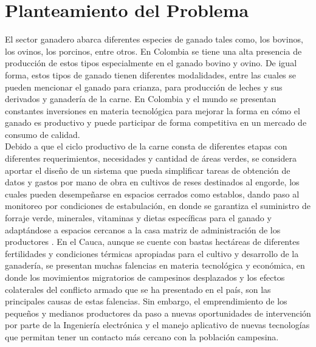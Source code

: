 
\section{Planteamiento del Problema} \label{plant}

El sector ganadero abarca diferentes especies de ganado tales como, los bovinos, los ovinos, los porcinos, entre otros. En Colombia se tiene una alta presencia de producción de estos tipos especialmente en el ganado bovino y ovino. De igual forma, estos tipos de ganado tienen diferentes modalidades, entre las cuales se pueden mencionar el ganado para crianza, para producción de leches y sus derivados y ganadería de la carne. En Colombia y el mundo se presentan constantes inversiones en materia tecnológica para mejorar la forma en cómo el ganado es productivo y puede participar de forma competitiva en un mercado de consumo de calidad.\\

Debido a que el ciclo productivo de la carne consta de diferentes etapas con diferentes requerimientos, necesidades y cantidad de áreas verdes, se considera aportar el diseño de un sistema que pueda simplificar  tareas de obtención de datos y gastos por mano de obra en cultivos de reses destinados al engorde, los cuales pueden desempeñarse en espacios cerrados como establos, dando paso al monitoreo por condiciones de estabulación, en donde se garantiza el suministro de forraje verde, minerales, vitaminas y dietas específicas para el ganado y adaptándose a espacios cercanos a la casa matriz de administración de los productores \cite{contextoganadero}.
En el Cauca, aunque se cuente con bastas hectáreas de diferentes fertilidades y condiciones térmicas apropiadas para el cultivo y desarrollo de la ganadería, se presentan muchas falencias en materia tecnológica y económica, en donde los movimientos migratorios de campesinos desplazados y los efectos colaterales del conflicto armado que se ha presentado en el país, son las principales causas de estas falencias. Sin embargo, el emprendimiento de los pequeños y medianos productores da paso a nuevas oportunidades de intervención por parte de la Ingeniería electrónica y el manejo aplicativo de nuevas tecnologías que permitan tener un contacto más cercano con la población campesina. \\


